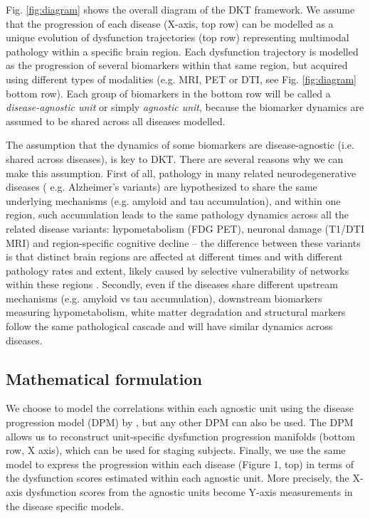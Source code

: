 \documentclass{llncs}
\begin{document}
Fig. \ref{fig:diagram} shows the overall diagram of the DKT framework. We assume that the progression of each disease (X-axis, top row) can be modelled as a unique evolution of dysfunction trajectories (top row) representing multimodal pathology within a specific brain region. Each dysfunction trajectory is modelled as the progression of several biomarkers within that same region, but acquired using different types of modalities (e.g. MRI, PET or DTI, see Fig. \ref{fig:diagram} bottom row). Each group of biomarkers in the bottom row will be called a \emph{disease-agnostic unit} or simply \emph{agnostic unit}, because the biomarker dynamics are assumed to be shared across all diseases modelled.

The assumption that the dynamics of some biomarkers are disease-agnostic (i.e. shared across diseases), is key to DKT. There are several reasons why we can make this assumption. First of all, pathology in many related neurodegenerative diseases ( e.g. Alzheimer's variants) are hypothesized to share the same underlying mechanisms (e.g. amyloid and tau accumulation), and within one region, such accumulation leads to the same pathology dynamics across all the related disease variants: hypometabolism (FDG PET), neuronal damage (T1/DTI MRI) and region-specific cognitive decline \cite{jack2010hypothetical} -- the difference between these variants is that distinct brain regions are affected at different times and with different pathology rates and extent, likely caused by selective vulnerability of networks within these regions \cite{seeley2009neurodegenerative}. Secondly, even if the diseases share different upstream mechanisms (e.g. amyloid vs tau accumulation), downstream biomarkers measuring hypometabolism, white matter degradation and structural markers follow the same pathological cascade and will have similar dynamics across diseases.

\subsection{Mathematical formulation}

We choose to model the correlations within each agnostic unit using the disease progression model (DPM) by \cite{jedynak2012computational}, but any other DPM can also be used. The DPM allows us to reconstruct unit-specific dysfunction progression manifolds (bottom row, X axis), which can be used for staging subjects. Finally, we use the same model to express the progression within each disease (Figure 1, top) in terms of the dysfunction scores estimated within each agnostic unit. More precisely, the X-axis dysfunction scores from the agnostic units become Y-axis measurements in the disease specific models.
\end{document}
